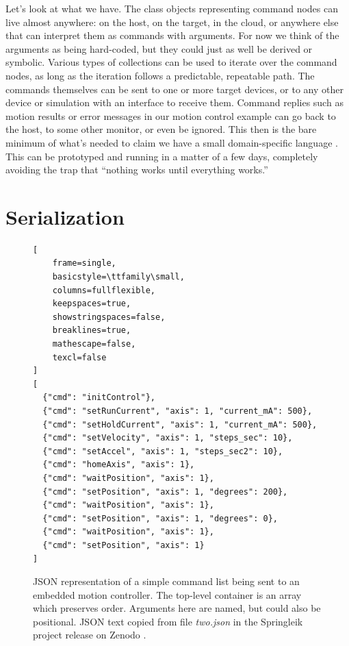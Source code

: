 \documentclass[a4paper,10pt]{article}
\begin{document}
Let's look at what we have. The class objects representing command nodes can live almost anywhere: on the host, on the target, in the cloud, or anywhere else that can interpret them as commands with arguments. For now we think of the arguments as being hard-coded, but they could just as well be derived or symbolic. Various types of collections can be used to iterate over the command nodes, as long as the iteration follows a predictable, repeatable path. The commands themselves can be sent to one or more target devices, or to any other device or simulation with an interface to receive them. Command replies such as motion results or error messages in our motion control example can go back to the host, to some other monitor, or even be ignored. This then is the bare minimum of what's needed to claim we have a small domain-specific language \cite{MFowler}. This can be prototyped and running in a matter of a few days, completely avoiding the trap that ``nothing works until everything works.''

\section{Serialization}

\begin{figure}[t]
\centering
\begin{minipage}{0.9\linewidth}
\begin{lstlisting}[
    frame=single,
    basicstyle=\ttfamily\small,
    columns=fullflexible,
    keepspaces=true,
    showstringspaces=false,
    breaklines=true,
    mathescape=false,
    texcl=false
]
[
  {"cmd": "initControl"},
  {"cmd": "setRunCurrent", "axis": 1, "current_mA": 500},
  {"cmd": "setHoldCurrent", "axis": 1, "current_mA": 500},
  {"cmd": "setVelocity", "axis": 1, "steps_sec": 10},
  {"cmd": "setAccel", "axis": 1, "steps_sec2": 10},
  {"cmd": "homeAxis", "axis": 1},
  {"cmd": "waitPosition", "axis": 1},
  {"cmd": "setPosition", "axis": 1, "degrees": 200},
  {"cmd": "waitPosition", "axis": 1},
  {"cmd": "setPosition", "axis": 1, "degrees": 0},
  {"cmd": "waitPosition", "axis": 1},
  {"cmd": "setPosition", "axis": 1}
]
\end{lstlisting}
\end{minipage}
\caption{JSON representation of a simple command list being sent to an embedded motion controller. The top-level container is an array which preserves order. Arguments here are named, but could also be positional. JSON text copied from file \textit{two.json} in the Springleik project release on Zenodo \protect\cite{ZenodoPython}.}
\label{simpleListing}
\end{figure}
\end{document}

